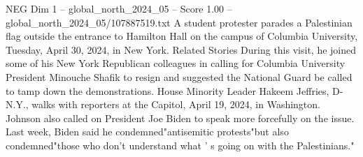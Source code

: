 \begin{textsample}{NEG Dim 1 – global\_north\_2024\_05 – Score 1.00 – global\_north\_2024\_05/107887519.txt}
A student protester parades a Palestinian flag outside the entrance to Hamilton Hall on the campus of Columbia University, Tuesday, April 30, 2024, in New York.
Related Stories During this visit, he joined some of his New York Republican colleagues in calling for Columbia University President Minouche Shafik to resign and suggested the National Guard be called to tamp down the demonstrations.
House Minority Leader Hakeem Jeffries, D-N.Y., walks with reporters at the Capitol, April 19, 2024, in Washington.
Johnson also called on President Joe Biden to speak more forcefully on the issue.
Last week, Biden said he condemned"antisemitic protests"but also condemned"those who don't understand what ' s going on with the Palestinians."

\end{textsample}
